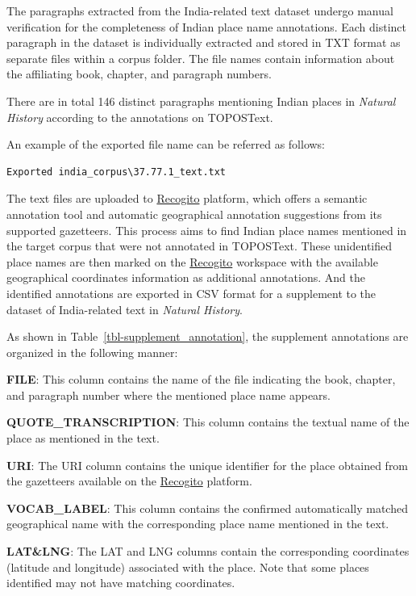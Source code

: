 \documentclass[
  12pt,
]{article}
\begin{document}
The paragraphs extracted from the India-related text dataset undergo
manual verification for the completeness of Indian place name
annotations. Each distinct paragraph in the dataset is individually
extracted and stored in TXT format as separate files within a corpus
folder. The file names contain information about the affiliating book,
chapter, and paragraph numbers.

There are in total 146 distinct paragraphs mentioning Indian places in
\emph{Natural History} according to the annotations on TOPOSText.

An example of the exported file name can be referred as follows:

\begin{verbatim}
Exported india_corpus\37.77.1_text.txt
\end{verbatim}

The text files are uploaded to
\href{https://recogito.pelagios.org/}{Recogito} platform, which offers a
semantic annotation tool and automatic geographical annotation
suggestions from its supported gazetteers. This process aims to find
Indian place names mentioned in the target corpus that were not
annotated in TOPOSText. These unidentified place names are then marked
on the \href{https://recogito.pelagios.org/}{Recogito} workspace with
the available geographical coordinates information as additional
annotations. And the identified annotations are exported in CSV format
for a supplement to the dataset of India-related text in \emph{Natural
History}.

As shown in Table~\ref{tbl-supplement_annotation}, the supplement
annotations are organized in the following manner:

\textbf{FILE}: This column contains the name of the file indicating the
book, chapter, and paragraph number where the mentioned place name
appears.

\textbf{QUOTE\_TRANSCRIPTION}: This column contains the textual name of
the place as mentioned in the text.

\textbf{URI}: The URI column contains the unique identifier for the
place obtained from the gazetteers available on the
\href{https://recogito.pelagios.org/}{Recogito} platform.

\textbf{VOCAB\_LABEL}: This column contains the confirmed automatically
matched geographical name with the corresponding place name mentioned in
the text.

\textbf{LAT\&LNG}: The LAT and LNG columns contain the corresponding
coordinates (latitude and longitude) associated with the place. Note
that some places identified may not have matching coordinates.
\end{document}
